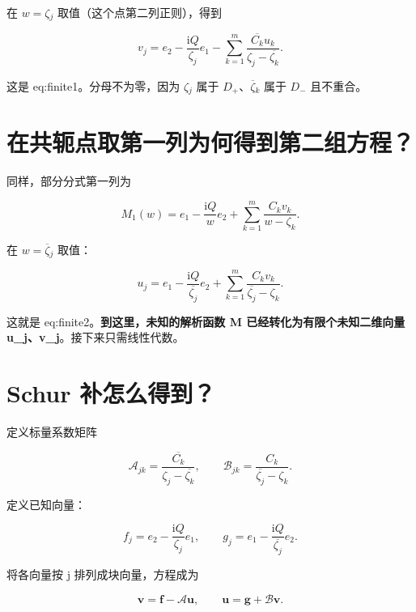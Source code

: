 在 $w=\zeta{}_j$ 取值（这个点第二列正则），得到\par

\[
\boxed{
v_j=e_2-\dfrac{\mathrm{i}Q}{\zeta_j}e_1
-\sum\limits_{k=1}^{m}
\dfrac{\overline{C_k}u_k}{\zeta_j-\overline{\zeta_k}}.
}
\]

这是 eq:finite1。分母不为零，因为 $\zeta{}_j$ 属于 $D_{+}$、$\overline\zeta{}_k$ 属于 $D_{-}$ 且不重合。\par

\section{在共轭点取第一列为何得到第二组方程？}
\par

同样，部分分式第一列为\par

\[
M_1(w)=e_1-\dfrac{\mathrm{i}Q}{w}e_2
+\sum\limits_{k=1}^{m}\dfrac{C_kv_k}{w-\zeta_k}.
\]

在 $w=\overline\zeta{}_j$ 取值：\par

\[
\boxed{
u_j=e_1-\dfrac{\mathrm{i}Q}{\overline{\zeta_j}}e_2
+\sum\limits_{k=1}^{m}
\dfrac{C_kv_k}{\overline{\zeta_j}-\zeta_k}.
}
\]

这就是 eq:finite2。\textbf{到这里，未知的解析函数 M 已经转化为有限个未知二维向量 u\_j、v\_j}。接下来只需线性代数。\par

\section{Schur 补怎么得到？}
\par

定义标量系数矩阵\par

\[
\mathcal A_{jk}
=\dfrac{\overline{C_k}}{\zeta_j-\overline{\zeta_k}},
\qquad
\mathcal B_{jk}
=\dfrac{C_k}{\overline{\zeta_j}-\zeta_k}.
\]

定义已知向量：\par

\[
f_j=e_2-\dfrac{\mathrm{i}Q}{\zeta_j}e_1,
\qquad
g_j=e_1-\dfrac{\mathrm{i}Q}{\overline{\zeta_j}}e_2.
\]

将各向量按 j 排列成块向量，方程成为\par

\[
\boldsymbol v=\boldsymbol f-\mathcal A\boldsymbol u,\qquad
\boldsymbol u=\boldsymbol g+\mathcal B\boldsymbol v.
\]

